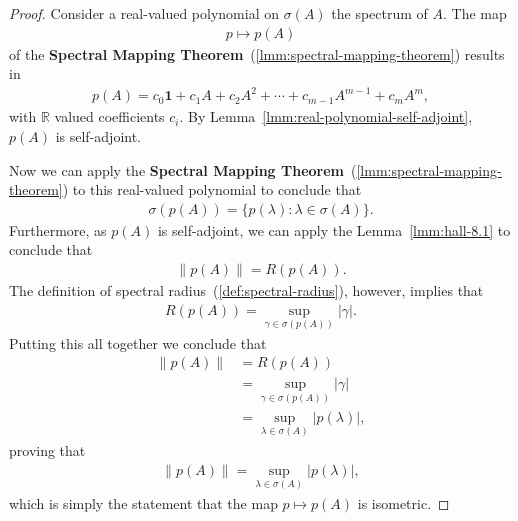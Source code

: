 \begin{proof}
    \leanok
Consider a real-valued polynomial on $\sigma(A)$ the spectrum of $A$. The map 
\begin{align}
    p \longmapsto p(A)
\end{align}
of the \textbf{Spectral Mapping Theorem}~(\ref{lmm:spectral-mapping-theorem}) results in
\begin{align}
    p(A) = c_0 \mathbf{1} + c_1 A + c_2 A^2 + \cdots + c_{m - 1} A^{m - 1} + c_m A^m,
\end{align}
with $\mathbb{R}$ valued coefficients $c_i$. By Lemma~\ref{lmm:real-polynomial-self-adjoint}, $p(A)$ is self-adjoint.

Now we can apply the \textbf{Spectral Mapping Theorem}~(\ref{lmm:spectral-mapping-theorem}) to this real-valued polynomial to conclude that
\begin{align}
    \sigma(p(A)) = \{ p(\lambda) : \lambda \in \sigma(A) \}.
\end{align}
Furthermore, as $p(A)$ is self-adjoint, we can apply the Lemma~\ref{lmm:hall-8.1} to conclude that
\begin{align}
    \|p(A)\| = R(p(A)).
\end{align}
The definition of spectral radius~(\ref{def:spectral-radius}), however, implies that
\begin{align}
    R(p(A)) = \sup\limits_{\gamma \in \sigma(p(A))} \lvert \gamma \rvert.
\end{align}
Putting this all together we conclude that
\begin{align}
    \|p(A)\| &= R(p(A)) \\
             &= \sup\limits_{\gamma \in \sigma(p(A))} \lvert \gamma \rvert \\
             &= \sup\limits_{\lambda \in \sigma(A)} \lvert p(\lambda) \rvert,
\end{align}
proving that
\begin{align}
    \|p(A)\| = \sup\limits_{\lambda \in \sigma(A)} \lvert p(\lambda) \rvert,
\end{align}
which is simply the statement that the map $p \mapsto p(A)$ is isometric.


\end{proof}
